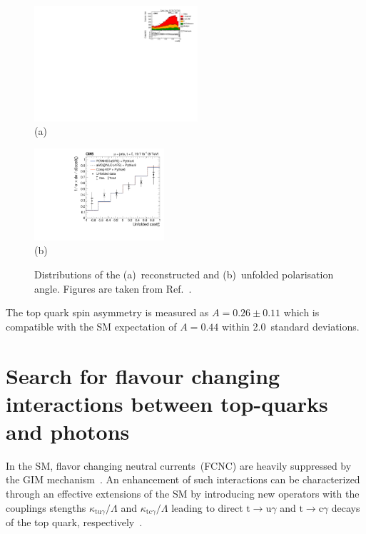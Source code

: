 \documentclass{PoS}
\begin{document}
\begin{figure}[htbp]
\begin{center}
\parbox[t]{0.55\textwidth}{\centering\includegraphics[width=0.54\textwidth]{figures/polarization/2j1t_cos_theta.pdf}\\(a)}
\parbox[t]{0.44\textwidth}{\centering\includegraphics[width=0.43\textwidth]{figures/polarization/cos_theta_unfolded.pdf}\\(b)}
\caption{\label{fig:costheta}Distributions of the (a)~reconstructed and (b)~unfolded polarisation angle. Figures are taken from Ref.~\cite{CMS-PAS-TOP-13-001}.}
\end{center}
\end{figure}

The top quark spin asymmetry is measured as $A=0.26\pm0.11$ which is compatible with the SM expectation of $A=0.44$ within 2.0~standard deviations.


\section{Search for flavour changing interactions between top-quarks and photons}

In the SM, flavor changing neutral currents~(FCNC) are heavily suppressed by the GIM mechanism~\cite{fcnc}. An enhancement of such interactions can be characterized through an effective extensions of the SM by introducing new operators with the couplings stengths $\kappa_{\mathrm{tu}\gamma}/\Lambda$ and $\kappa_{\mathrm{tc}\gamma}/\Lambda$ leading to direct $\mathrm{t}\to\mathrm{u}\gamma$ and $\mathrm{t}\to\mathrm{c}\gamma$ decays of the top quark, respectively~\cite{minimal-anom-set}. 
\end{document}
